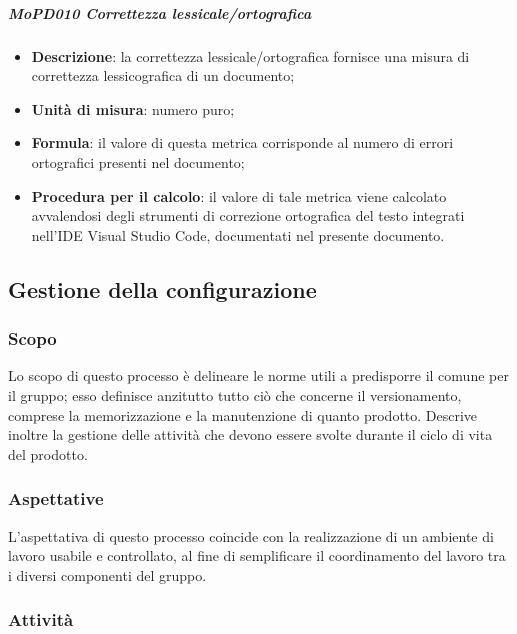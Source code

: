 \documentclass[../norme-di-progetto.tex]{subfiles}
\begin{document}
\subparagraph{MoPD010 Correttezza lessicale/ortografica}
\begin{itemize}
  \item \textbf{Descrizione}: la correttezza lessicale/ortografica fornisce una misura di correttezza lessicografica di un documento;
  \item \textbf{Unità di misura}: numero puro;
  \item \textbf{Formula}: il valore di questa metrica corrisponde al numero di errori ortografici presenti nel documento;
  \item \textbf{Procedura per il calcolo}: il valore di tale metrica viene calcolato avvalendosi degli strumenti di correzione ortografica del testo integrati nell'IDE Visual Studio Code, documentati nel presente documento.
\end{itemize}

\subsection{Gestione della configurazione}
\subsubsection{Scopo}
Lo scopo di questo processo è delineare le norme utili a predisporre il  comune per il gruppo; esso definisce anzitutto tutto ciò che concerne il versionamento, comprese la memorizzazione e la manutenzione di quanto prodotto. Descrive inoltre la gestione delle attività che devono essere svolte durante il ciclo di vita del prodotto.

\subsubsection{Aspettative}
L'aspettativa di questo processo coincide con la realizzazione di un ambiente di lavoro usabile e controllato, al fine di semplificare il coordinamento del lavoro tra i diversi componenti del gruppo.

\subsubsection{Attività}
\end{document}
